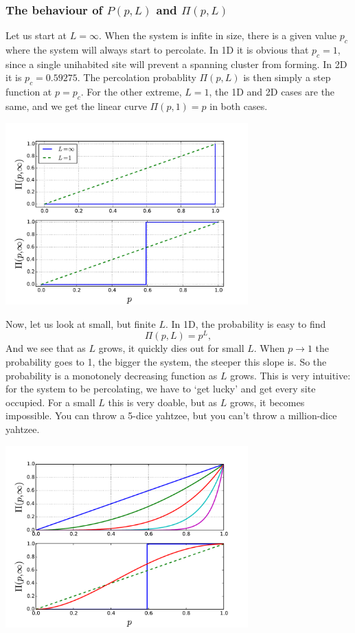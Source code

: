 \documentclass[a4paper, 11pt, notitlepage, english]{article}
\begin{document}
\subsubsection*{The behaviour of $P(p, L)$ and $\Pi(p, L)$}

Let us start at $L=\infty$. When the system is infite in size, there is a given value $p_c$ where the system will always start to percolate. In 1D it is obvious that $p_c = 1$, since a single unihabited site will prevent a spanning cluster from forming. In 2D it is $p_c = 0.59275$. The percolation probablity $\Pi(p,L)$ is then simply a step function at $p=p_c$.  For the other extreme, $L=1$, the 1D and 2D cases are the same, and we get the linear curve $\Pi(p, 1) = p$ in both cases. 
\begin{center}
	\includegraphics[width=0.7\textwidth]{15.pdf}
\end{center}

Now, let us look at small, but finite $L$. In 1D, the probability is easy to find
$$\Pi(p,L) = p^L,$$
And we see that as $L$ grows, it quickly dies out for small $L$. When $p \to 1$ the probability goes to 1, the bigger the system, the steeper this slope is. So the probability is a monotonely decreasing function as $L$ grows. This is very intuitive: for the system to be percolating, we have to `get lucky' and get every site occupied. For a small $L$ this is very doable, but as $L$ grows, it becomes impossible. You can throw a 5-dice yahtzee, but you can't throw a million-dice yahtzee.

\begin{center}
	\includegraphics[width=0.7\textwidth]{15b.pdf}
\end{center}
\end{document}
